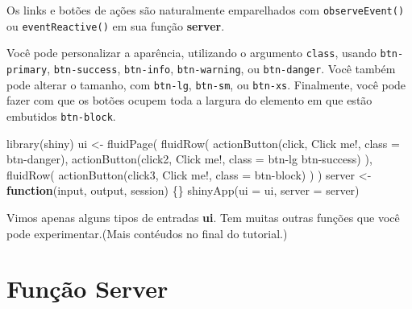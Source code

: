 \documentclass[
]{book}
\newenvironment{Shaded}{\begin{snugshade}}{\end{snugshade}}
\newcommand{\AttributeTok}[1]{\textcolor[rgb]{0.77,0.63,0.00}{#1}}
\newcommand{\ControlFlowTok}[1]{\textcolor[rgb]{0.13,0.29,0.53}{\textbf{#1}}}
\newcommand{\FunctionTok}[1]{\textcolor[rgb]{0.00,0.00,0.00}{#1}}
\newcommand{\NormalTok}[1]{#1}
\newcommand{\OtherTok}[1]{\textcolor[rgb]{0.56,0.35,0.01}{#1}}
\newcommand{\StringTok}[1]{\textcolor[rgb]{0.31,0.60,0.02}{#1}}
\begin{document}
Os links e botões de ações são naturalmente emparelhados com \texttt{observeEvent()} ou \texttt{eventReactive()} em sua função \textbf{server}.

Você pode personalizar a aparência, utilizando o argumento \texttt{class}, usando \texttt{btn-primary}, \texttt{btn-success}, \texttt{btn-info}, \texttt{btn-warning}, ou \texttt{btn-danger}. Você também pode alterar o tamanho, com \texttt{btn-lg}, \texttt{btn-sm}, ou \texttt{btn-xs}. Finalmente, você pode fazer com que os botões ocupem toda a largura do elemento em que estão embutidos \texttt{btn-block}.

\begin{Shaded}
\begin{Highlighting}[]
\FunctionTok{library}\NormalTok{(shiny)}
\NormalTok{ui }\OtherTok{\textless{}{-}} \FunctionTok{fluidPage}\NormalTok{(}
  \FunctionTok{fluidRow}\NormalTok{(}
    \FunctionTok{actionButton}\NormalTok{(}\StringTok{\textquotesingle{}click\textquotesingle{}}\NormalTok{, }\StringTok{\textquotesingle{}Click me!\textquotesingle{}}\NormalTok{, }\AttributeTok{class =} \StringTok{\textquotesingle{}btn{-}danger\textquotesingle{}}\NormalTok{),}
    \FunctionTok{actionButton}\NormalTok{(}\StringTok{\textquotesingle{}click2\textquotesingle{}}\NormalTok{, }\StringTok{\textquotesingle{}Click me!\textquotesingle{}}\NormalTok{, }\AttributeTok{class =} \StringTok{\textquotesingle{}btn{-}lg btn{-}success\textquotesingle{}}\NormalTok{)}
\NormalTok{  ),}
  \FunctionTok{fluidRow}\NormalTok{(}
    \FunctionTok{actionButton}\NormalTok{(}\StringTok{\textquotesingle{}click3\textquotesingle{}}\NormalTok{, }\StringTok{\textquotesingle{}Click me!\textquotesingle{}}\NormalTok{, }\AttributeTok{class =} \StringTok{\textquotesingle{}btn{-}block\textquotesingle{}}\NormalTok{)}
\NormalTok{  )}
\NormalTok{)}
\NormalTok{server }\OtherTok{\textless{}{-}} \ControlFlowTok{function}\NormalTok{(input, output, session) \{\}}
\FunctionTok{shinyApp}\NormalTok{(}\AttributeTok{ui =}\NormalTok{ ui, }\AttributeTok{server =}\NormalTok{ server)}
\end{Highlighting}
\end{Shaded}

Vimos apenas alguns tipos de entradas \textbf{ui}. Tem muitas outras funções que você pode experimentar.(Mais contéudos no final do tutorial.)

\hypertarget{funuxe7uxe3o-server}{%
\chapter{\texorpdfstring{\textbf{Função Server}}{Função Server}}\label{funuxe7uxe3o-server}}
\end{document}
